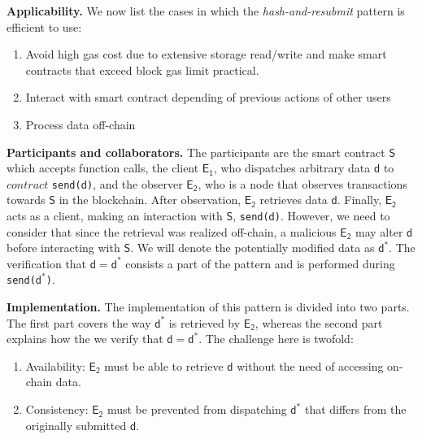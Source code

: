 \noindent
\textbf{Applicability.}
We now list the cases in which the \emph{hash-and-resubmit} pattern is
efficient to use:
\begin{enumerate}
    \item Avoid high gas cost due to extensive storage read/write and make
        smart contracts that exceed block gas limit practical.
    \item Interact with smart contract depending of previous actions of
        other users
    \item Process data off-chain
\end{enumerate}

\newcommand{\contract}{\mathsf{S}}
\newcommand{\client}{\mathsf{E_{1}}}
\newcommand{\observer}{\mathsf{E_{2}}}
\newcommand{\data}{\mathsf{d}}
\newcommand{\datao}{\mathsf{d^*}}

\noindent \textbf{Participants and collaborators.} The participants are the
smart contract $\contract$ which accepts function calls, the client $\client$,
who dispatches arbitrary data $\data$ to $contract$ \texttt{send($\data$)}, and
the observer $\observer$, who is a node that observes transactions towards
$\contract$ in the blockchain. After observation, $\observer$ retrieves data
$\data$. Finally, $\observer$ acts as a client, making an interaction with
$\contract$, \texttt{send($\data$)}. However, we need to consider that since
the retrieval was realized off-chain, a malicious $\observer$ may alter $\data$
before interacting with $\contract$. We will denote the potentially modified
data as $\datao$. The verification that $\data = \datao$ consists a part of the
pattern and is performed during \texttt{send($\datao$)}.

\noindent \textbf{Implementation.} The implementation of this pattern is
divided into two parts. The first part covers the way $\datao$ is retrieved by
$\observer$, whereas the second part explains how the we verify that
$\data=\datao$. The challenge here is twofold:

\begin{enumerate}

    \item Availability: $\observer$ must be able to retrieve $\data$ without
        the need of accessing on-chain data.

    \item Consistency: $\observer$ must be prevented from dispatching $\datao$
        that differs from the originally submitted $\data$.

\end{enumerate}

